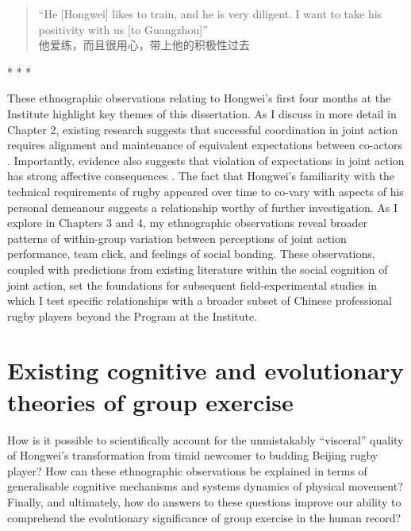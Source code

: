 \begin{CJK}{UTF8}{gbsn}
  \begin{quotation}
``He [Hongwei] likes to train, and he is very diligent. I want to take his positivity with us [to Guangzhou]'' \\
他爱练，而且很用心，带上他的积极性过去
  \end{quotation}
\end{CJK}

\begin{center}
  * * *
\end{center}


These ethnographic observations relating to Hongwei's first four months at the Institute highlight key themes of this dissertation.  As I discuss in more detail in Chapter 2, existing research suggests that successful coordination in joint action requires alignment and maintenance of equivalent expectations between co-actors \citep{Sebanz2006,Vesper2017,Pesquita2017}.  Importantly, evidence also suggests that violation of expectations in joint action has strong affective consequences \citep{Chetverikov2016}.  The fact that Hongwei's familiarity with the technical requirements of rugby appeared over time to co-vary with aspects of his personal demeanour suggests a relationship worthy of further investigation.  As I explore in Chapters 3 and 4, my ethnographic observations reveal broader patterns of within-group variation between perceptions of joint action performance, team click, and feelings of social bonding.  These observations, coupled with predictions from existing literature within the social cognition of joint action, set the foundations for subsequent field-experimental studies in which I test specific relationships with a broader subset of Chinese professional rugby players beyond the Program at the Institute.


\section{Existing cognitive and evolutionary theories of group exercise}

How is it possible to scientifically account for the unmistakably ``visceral'' quality of Hongwei's transformation from timid newcomer to budding Beijing rugby player? How can these ethnographic observations be explained in terms of generalisable cognitive mechanisms and systems dynamics of physical movement?  Finally, and ultimately, how do answers to these questions improve our ability to comprehend the evolutionary significance of group exercise in the human record?

